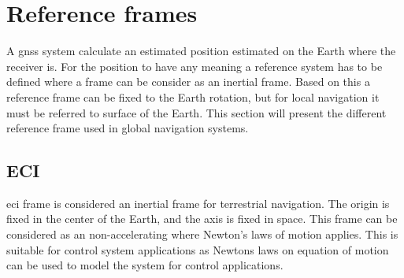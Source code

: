 \section{Reference frames}
A \gls{gnss} system calculate an estimated position estimated on the Earth where the receiver is. For the position to have any meaning a reference system has to be defined where a frame can be consider as an inertial frame. Based on this a reference frame can be fixed to the Earth rotation, but for local navigation it must be referred to surface of the Earth. This section will present the different reference frame used in global navigation systems.
\subsection{ECI}
\gls{eci} frame is considered an inertial frame for terrestrial navigation. The origin is fixed in the center of the Earth, and the axis is fixed in space. This frame can be considered as an non-accelerating where Newton's laws of motion applies. This is suitable for control system applications as Newtons laws on equation of motion can be used to model the system for control applications.
